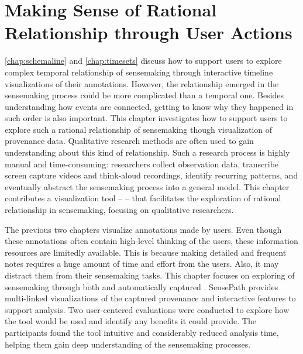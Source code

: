 \chapter{Making Sense of Rational Relationship through User Actions}
\label{chap:sensepath}

\graphicspath{{Chapter5/figures/}}



\autoref{chap:schemaline} and \autoref{chap:timesets} discuss how to support users to explore complex temporal relationship of sensemaking through interactive timeline visualizations of their annotations. However, the relationship emerged in the sensemaking process could be more complicated than a temporal one. Besides understanding how events are connected, getting to know why they happened in such order is also important. This chapter investigates how to support users to explore such a rational relationship of sensemaking though visualization of provenance data. Qualitative research methods are often used to gain understanding about this kind of relationship. Such a research process is highly manual and time-consuming: researchers collect observation data, transcribe screen capture videos and think-aloud recordings, identify recurring patterns, and eventually abstract the sensemaking process into a general model. This chapter contributes a visualization tool -- \emph{} -- that facilitates the exploration of rational relationship in sensemaking, focusing on qualitative researchers.

The previous two chapters visualize annotations made by users. Even though these annotations often contain high-level thinking of the users, these information resources are limitedly available. This is because making detailed and frequent notes requires a huge amount of time and effort from the users. Also, it may distract them from their sensemaking tasks. This chapter focuses on exploring  of sensemaking through both  and automatically captured . SensePath provides multi-linked visualizations of the captured provenance and interactive features to support analysis. Two user-centered evaluations were conducted to explore how the tool would be used and identify any benefits it could provide. The participants found the tool intuitive and considerably reduced analysis time, helping them gain deep understanding of the sensemaking processes.







